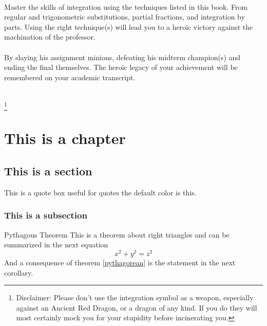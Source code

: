 \documentclass[letterpaper,10pt,twoside,onecolumn,openany]{book}
\begin{document}
\frontmatter                           
\begin{titlepage}
    ~
    \newpage
    
    \begin{center}
        

        \large
        \vspace*{\fill}
        Master the skills of integration using the techniques listed in this book. From regular and trigonometric substitutions, partial fractions, and integration by parts. Using the right technique(s) will lead you to a heroic victory against the machination of the professor. 
        \\~\\
        By slaying his assignment minions, defeating his midterm champion(s) and ending the final themselves. The heroic legacy of your achievement will be remembered on your academic transcript.
        \\~\\
        \vspace*{\fill}

    \end{center}
    \let\thefootnote\relax\footnote{Disclaimer: Please don't use the integration symbol as a weapon, especially against an Ancient Red Dragon, or a dragon of any kind. If you do they will most certainly mock you for your stupidity before incinerating you.}
\end{titlepage}
\tableofcontents
\mainmatter

\chapter{This is a chapter}

\section{This is a section}
\lipsum[1]
\begin{quotebox}
    This is a quote box useful for quotes the default color is this.
\end{quotebox}
\lipsum[11]
\subsection{This is a subsection}
\begin{Theorem}{Pythagous Theorem}
\label{pythagorean}
This is a theorem about right triangles and can be summarized in the next equation 
\[ x^2 + y^2 = z^2 \]
And a consequence of theorem \ref{pythagorean} is the statement in the next corollary.
\end{Theorem}
\lipsum[5]
\begin{Note}
    \lipsum[4]
    \lipsum[6]
\end{Note}
\end{document}
